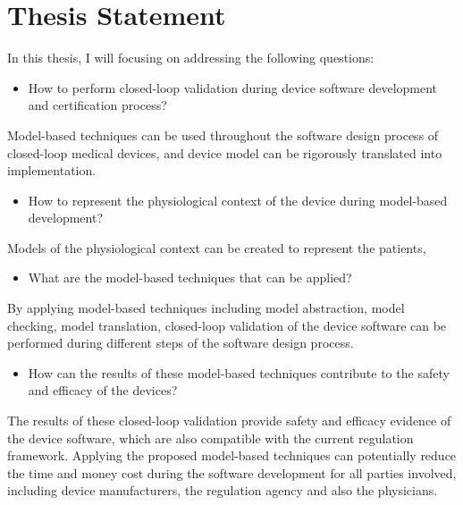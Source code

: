 \documentclass[a4paper]{article}
\begin{document}
\section*{Thesis Statement}
In this thesis, I will focusing on addressing the following questions:
\begin{itemize}
\item How to perform closed-loop validation during device software development and certification process?
\end{itemize}
Model-based techniques can be used throughout the software design process of closed-loop medical devices, and device model can be rigorously translated into implementation. 
\begin{itemize}
\item How to represent the physiological context of the device during model-based development?
\end{itemize}
Models of the physiological context can be created to represent the patients,
\begin{itemize}
\item What are the model-based techniques that can be applied?
\end{itemize}
By applying model-based techniques including model abstraction, model checking, model translation, closed-loop validation of the device software can be performed during different steps of the software design process.
\begin{itemize}
\item How can the results of these model-based techniques contribute to the safety and efficacy of the devices?
\end{itemize}
The results of these closed-loop validation provide safety and efficacy evidence of the device software, which are also compatible with the current regulation framework. 
Applying the proposed model-based techniques can potentially reduce the time and money cost during the software development for all parties involved, including device manufacturers, the regulation agency and also the physicians.


\newpage
\end{document}
